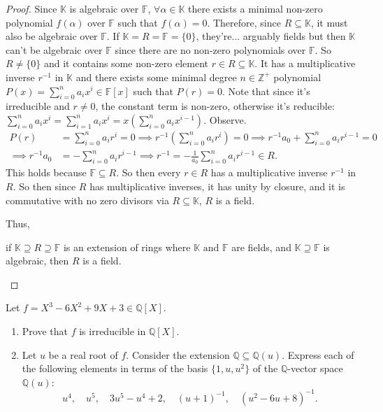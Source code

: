 \documentclass[addpoints,10pt]{exam}
\theoremstyle{plain}
\theoremstyle{definition}
\newtheorem{prob}[thm]{Problem}
\theoremstyle{plain}
\theoremstyle{plain}
\theoremstyle{definition}
\let\oldprob\prob
\let\endoldprob\endprob
\renewenvironment{prob}
  {\begin{singlespace}\oldprob}
  {\endoldprob\end{singlespace}}
\newcommand{\FF}{\ensuremath{\mathbb{F}}}
\newcommand{\KK}{\ensuremath{\mathbb{K}}}
\newcommand{\ZZ}{\ensuremath{\mathbb{Z}}}
\begin{document}
\begin{proof}
Since $\KK$ is algebraic over $\FF$, $\forall \alpha\in \KK$ there exists a minimal non-zero polynomial $f(\alpha)$ over $\FF$ such that $f(\alpha)=0$. Therefore, since $R\subseteq \KK$, it must also be algebraic over $\FF$. If $\KK=R=\FF=\{0\}$, they're... arguably fields but then $\KK$ can't be algebraic over $\FF$ since there are no non-zero polynomials over $\FF$. So $R\neq \{0\}$ and it contains some non-zero element $r\in R\subseteq \KK$. It has a multiplicative inverse $r^{-1}$ in  $\KK$ and there exists some minimal degree $n\in \ZZ^{+}$ polynomial $P(x)=\sum_{i=0}^{n}a_{i}x^{i}\in \FF[x]$ such that $P(r)=0$. Note that since it's irreducible and $r\neq 0$, the constant term is non-zero, otherwise it's reducible: $\sum_{i=0}^{n}a_{i}x^{i}=\sum_{i=1}^{n}a_{i}x^{i}=x(\sum_{i=0}^{n}a_{i}x^{i-1})$. Observe.
\begin{align*}
  P(r)&=\sum_{i=0}^{n}a_{i}r^{i}=0\implies r^{-1}(\sum_{i=0}^{n}a_{i}r^{i})=0\implies r^{-1}a_{0}+\sum_{i=0}^{n}a_{i}r^{i-1}=0\\
  \implies r^{-1}a_{0}&=-\sum_{i=0}^{n}a_{i}r^{i-1}\implies r^{-1}=-\frac{1}{a_{0}}\sum_{i=0}^{n}a_{i}r^{i-1}\in R.
\end{align*}
This holds because $\FF\subseteq R$. So then every $r\in R$ has a multiplicative inverse $r^{-1}$ in $R$. So then since $R$ has multiplicative inverses, it has unity by closure, and it is commutative with no zero divisors via $R\subseteq \KK$, $R$ is a field.

Thus,
\begin{center}
if $\KK \supseteq R \supseteq \FF$ is an extension of rings where $\KK\text{ and }\FF$ are fields, and $\KK \supseteq \FF$ is algebraic, then $R$ is a field.
\end{center}
\end{proof}
\newpage
\begin{prob}
Let $f = X^3 - 6X^2 + 9X + 3 \in \mathbb{Q}[X]$.
\begin{enumerate}[label=(\alph*)]
\item Prove that $f$ is irreducible in $\mathbb{Q}[X]$.
\item Let $u$ be a real root of $f$. Consider the extension $\mathbb{Q} \subseteq \mathbb{Q}(u)$. Express each of the following elements in terms of the basis $\{1,u,u^2\}$ of the $\mathbb{Q}$-vector space $\mathbb{Q}(u)$:
\[
u^4,\quad u^5,\quad 3u^5 - u^4 + 2,\quad (u+1)^{-1},\quad (u^2 - 6u + 8)^{-1}.
\]
\end{enumerate}
\end{prob}
\end{document}
